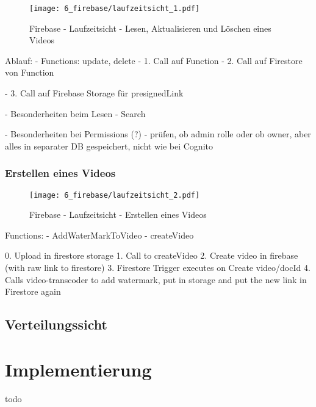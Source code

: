 \begin{figure}
  \centering
  \texttt{[image: 6\_firebase/laufzeitsicht\_1.pdf]}
  \caption{Firebase - Laufzeitsicht - Lesen, Aktualisieren und Löschen eines Videos}
  \label{Firebase:laufzeitsicht1}
\end{figure}


Ablauf:
- Functions: update, delete
- 1. Call auf Function
- 2. Call auf Firestore von Function

- 3. Call auf Firebase Storage für presignedLink

- Besonderheiten beim Lesen
  - Search

- Besonderheiten bei Permissions (?)
  - prüfen, ob admin rolle oder ob owner, aber alles in separater DB gespeichert, nicht wie bei Cognito

\subsubsection{Erstellen eines Videos}

\begin{figure}
  \centering
  \texttt{[image: 6\_firebase/laufzeitsicht\_2.pdf]}
  \caption{Firebase - Laufzeitsicht - Erstellen eines Videos}
  \label{Firebase:laufzeitsicht2}
\end{figure}

Functions:
- AddWaterMarkToVideo
- createVideo

0. Upload in firestore storage
1. Call to createVideo
2. Create video in firebase (with raw link to firestore)
3. Firestore Trigger executes on Create video/{docId}
4. Calls video-transcoder to add watermark, put in storage and put the new link in Firestore again


\subsection{Verteilungssicht}

\section{Implementierung}

todo